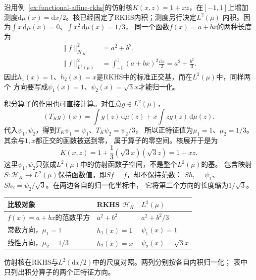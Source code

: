 \begin{example}[同一个核在两种内积下的坐标]
\label{ex:functional-affine-mercer-coordinates}
沿用例~\ref{ex:functional-affine-rkhs}的仿射核$K(x,z)=1+xz$，在$[-1,1]$上增加
测度$\mathrm d\mu(x)=\mathrm dx/2$。核已经固定了RKHS内积；测度另行决定$L^2(\mu)$
内积。因为$\int x\,\mathrm d\mu(x)=0$、$\int x^2\,\mathrm d\mu(x)=1/3$，
同一个函数$f(x)=a+bx$的两种长度为
\begin{equation}
 \begin{aligned}
  \lVert f\rVert_{\mathcal H_K}^2&=a^2+b^2,\\
  \lVert f\rVert_{L^2(\mu)}^2
  &=\int_{-1}^1(a+bx)^2\frac{\mathrm dx}{2}
    =a^2+\frac{b^2}{3}.
 \end{aligned}
 \label{eq:functional-affine-two-norms}
\end{equation}
因此$h_1(x)=1$、$h_2(x)=x$是RKHS中的标准正交基，而在$L^2(\mu)$中，同样两个
方向要写成$\psi_1(x)=1$、$\psi_2(x)=\sqrt3x$才能归一化。

积分算子的作用也可直接计算。对任意$g\in L^2(\mu)$，
\[
 (T_Kg)(x)=\int g(z)\,\mathrm d\mu(z)
             +x\int zg(z)\,\mathrm d\mu(z).
\]
代入$\psi_1,\psi_2$，得到$T_K\psi_1=\psi_1$、$T_K\psi_2=\psi_2/3$，
所以正特征值为$\mu_1=1$、$\mu_2=1/3$。其余与$1,x$都正交的函数被送到零，
属于算子的零空间。核展开于是为
\[
 K(x,z)=1+\frac13(\sqrt3x)(\sqrt3z)=1+xz.
\]
这里$\psi_1,\psi_2$只张成$L^2(\mu)$中的仿射函数子空间，不是整个$L^2(\mu)$的基。
包含映射$S:\mathcal H_K\to L^2(\mu)$保持函数值，即$Sf=f$，却不保持范数：
$Sh_1=\psi_1$、$Sh_2=\psi_2/\sqrt3$。在两边各自的归一化坐标中，
它将第二个方向的长度缩为$1/\sqrt3$。
\end{example}

\begin{center}
\begin{minipage}{\linewidth}
 \centering\small
 \begin{tabularx}{\linewidth}{@{}lXX@{}}
 \toprule
 比较对象 & RKHS $\mathcal H_K$ & $L^2(\mu)$\\
 \midrule
 $f(x)=a+bx$的范数平方 & $a^2+b^2$ & $a^2+b^2/3$\\
 常数方向，$\mu_1=1$ & $h_1(x)=1$ & $\psi_1(x)=1$\\
 线性方向，$\mu_2=1/3$ & $h_2(x)=x$ & $\psi_2(x)=\sqrt3x$\\
 \bottomrule
 \end{tabularx}
   {仿射核在RKHS与$L^2(\mathrm dx/2)$中的尺度对照。两列分别按各自内积归一化；
   表中只列出积分算子的两个正特征方向。}
\end{minipage}
\end{center}

